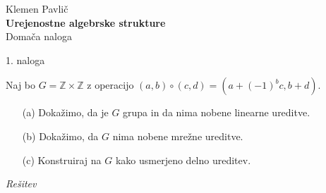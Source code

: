 \documentclass[a4paper, 12pt]{article}
\newcommand{\Z}{\mathbb{Z}}
\begin{document}
\thispagestyle{empty}
\vfill

\begin{center}{\large 
Klemen Pavlič\\[2mm]
{\bf Urejenostne algebrske strukture}\\[10mm]
Domača naloga}
\end{center}
\vfill

\pagebreak
\newpage 

\begin{flushleft}
1. naloga
\end{flushleft}
Naj bo $G=\Z\times \Z$ z operacijo $(a,b)\circ (c,d) = (a+(-1)^b c, b+d)$.
\begin{enumerate}
\item[(a)] Dokažimo, da je $G$ grupa in da nima nobene linearne  ureditve.
\item[(b)] Dokažimo, da $G$ nima nobene mrežne ureditve.
\item[(c)] Konstruiraj na $G$ kako usmerjeno delno ureditev.
\end{enumerate}
\emph{Rešitev}
\end{document}
